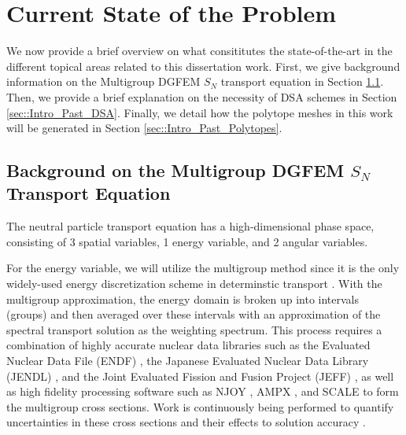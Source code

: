 \section{Current State of the Problem}
\label{sec::Intro_Past}

We now provide a brief overview on what consititutes the state-of-the-art in the different topical areas related to this dissertation work. First, we give background information on the Multigroup DGFEM $S_N$ transport equation in Section \ref{sec::Intro_Past_DGFEMMGSn}. Then, we provide a brief explanation on the necessity of DSA schemes in Section \ref{sec::Intro_Past_DSA}. Finally, we detail how the polytope meshes in this work will be generated in Section \ref{sec::Intro_Past_Polytopes}.

\subsection{Background on the Multigroup DGFEM $S_N$ Transport Equation}
\label{sec::Intro_Past_DGFEMMGSn}

The neutral particle transport equation has a high-dimensional phase space, consisting of 3 spatial variables, 1 energy variable, and 2 angular variables. 

For the energy variable, we will utilize the multigroup method since it is the only widely-used energy discretization scheme in determinstic transport \cite{duderstadt1976nuclear,bell1979nuclear}. With the multigroup approximation, the energy domain is broken up into intervals (groups) and then averaged over these intervals with an approximation of the spectral transport solution as the weighting spectrum. This process requires a combination of highly accurate nuclear data libraries such as the Evaluated Nuclear Data File (ENDF) \cite{chadwick2006endf,chadwick2011endf}, the Japanese Evaluated Nuclear Data Library (JENDL) \cite{shibata2002japanese}, and the Joint Evaluated Fission and Fusion Project (JEFF) \cite{koning2006jeff}, as well as high fidelity processing software such as NJOY \cite{macfarlane2002njoy,kahler2012njoy}, AMPX \cite{dunn2002ampx}, and SCALE \cite{bucholz1982scale} to form the multigroup cross sections. Work is continuously being performed to quantify uncertainties in these cross sections and their effects to solution accuracy \cite{aliberti2006nuclear,jessee2008cross}.

